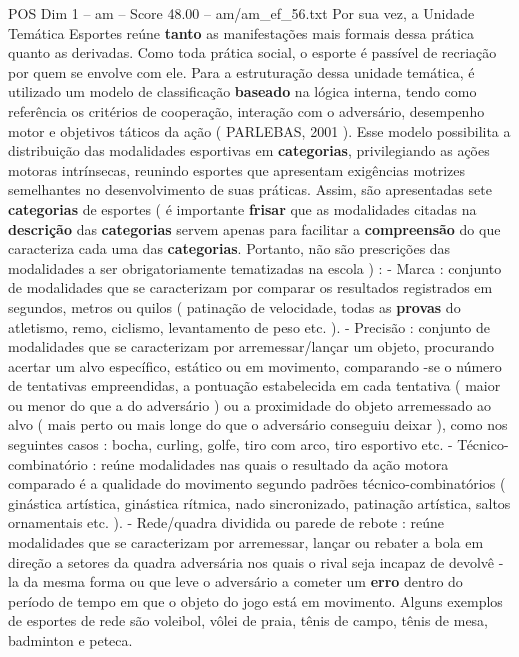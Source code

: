 \begin{textsample}{POS Dim 1 – am – Score 48.00 – am/am\_ef\_56.txt}
Por sua vez, a Unidade Temática Esportes reúne \textbf{tanto} as manifestações mais formais dessa prática quanto as derivadas.
Como toda prática social, o esporte é passível de recriação por quem se envolve com ele.
Para a estruturação dessa unidade temática, é utilizado um modelo de classificação \textbf{baseado} na lógica interna, tendo como referência os critérios de cooperação, interação com o adversário, desempenho motor e objetivos táticos da ação ( PARLEBAS, 2001 ).
Esse modelo possibilita a distribuição das modalidades esportivas em \textbf{categorias}, privilegiando as ações motoras intrínsecas, reunindo esportes que apresentam exigências motrizes semelhantes no desenvolvimento de suas práticas.
Assim, são apresentadas sete \textbf{categorias} de esportes ( é importante \textbf{frisar} que as modalidades citadas na \textbf{descrição} das \textbf{categorias} servem apenas para facilitar a \textbf{compreensão} do que caracteriza cada uma das \textbf{categorias}.
Portanto, não são prescrições das modalidades a ser obrigatoriamente tematizadas na escola ) : - Marca : conjunto de modalidades que se caracterizam por comparar os resultados registrados em segundos, metros ou quilos ( patinação de velocidade, todas as \textbf{provas} do atletismo, remo, ciclismo, levantamento de peso etc. ). - Precisão : conjunto de modalidades que se caracterizam por arremessar/lançar um objeto, procurando acertar um alvo específico, estático ou em movimento, comparando -se o número de tentativas empreendidas, a pontuação estabelecida em cada tentativa ( maior ou menor do que a do adversário ) ou a proximidade do objeto arremessado ao alvo ( mais perto ou mais longe do que o adversário conseguiu deixar ), como nos seguintes casos : bocha, curling, golfe, tiro com arco, tiro esportivo etc. - Técnico-combinatório : reúne modalidades nas quais o resultado da ação motora comparado é a qualidade do movimento segundo padrões técnico-combinatórios ( ginástica artística, ginástica rítmica, nado sincronizado, patinação artística, saltos ornamentais etc. ). - Rede/quadra dividida ou parede de rebote : reúne modalidades que se caracterizam por arremessar, lançar ou rebater a bola em direção a setores da quadra adversária nos quais o rival seja incapaz de devolvê -la da mesma forma ou que leve o adversário a cometer um \textbf{erro} dentro do período de tempo em que o objeto do jogo está em movimento.
Alguns exemplos de esportes de rede são voleibol, vôlei de praia, tênis de campo, tênis de mesa, badminton e peteca.

\end{textsample}
